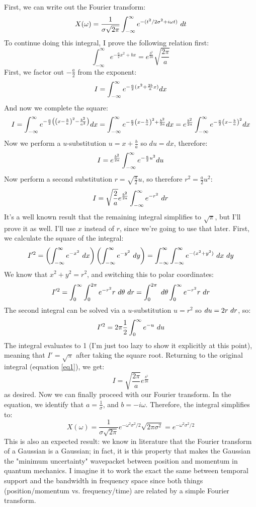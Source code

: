 \documentclass[10pt]{article}
\begin{document}
	\begin{solution}
		First, we can write out the Fourier transform:
		\[
		X(\omega) = \frac{1}{\sigma \sqrt{2\pi} }\int_{-\infty}^{\infty} e^{-(t^2 / 2 \sigma^2 + i \omega t)}
		\ d t
		\] 
		To continue doing this integral, I prove the following relation first:
		\[
		\int_{-\infty}^{\infty} e^{-\frac{a}{2}x^2 + bx} = e^{\frac{b^2}{2a}}\sqrt{\frac{2\pi }{a}} 
		\] 
		First, we factor out \( -\frac{a}{2} \) from the exponent:
				\[
					I = \int_{-\infty}^{\infty} e^{-\frac{a}{2}(x^2 + \frac{2b}{a}x)} dx
				\] 
		And now we complete the square:
		\[
			I = \int_{-\infty}^{\infty} e^{-\frac{a}{2}\left(\left(x - \frac{b}{a}\right)^2 - \frac{b^2}{a^2}\right)} dx
			= \int_{-\infty}^{\infty} e^{-\frac{a}{2}\left( x - \frac{b}{a} \right)^2 + \frac{b^2}{2a}} dx = e^{\frac{b^2}{2a}}
			\int_{-\infty}^{\infty} e^{-\frac{a}{2}\left( x - \frac{b}{a} \right)^2} dx
		\] 
		Now we perform a \( u \)-substitution \( u = x + \frac{b}{a} \) so \( du = dx \), therefore:
		\[
			I = e^{\frac{b^2}{2a}} \int_{-\infty}^{\infty} e^{-\frac{a}{2}u^2} du
		\] 
		Now perform a second substitution \( r = \sqrt{\frac{a}{2}}u \), so therefore \( r^2 = \frac{a}{2}u^2 \):
		\begin{equation}\label{eq1}
		I = \sqrt{\frac{2}{a}}e^{\frac{b^2}{2a}}\int_{-\infty}^{\infty} e^{-r^2} \ d r 
		\end{equation} 
		It's a well known result that the remaining integral simplifies to \( \sqrt{\pi}  \), but I'll prove 
		it as well. I'll use \( x \) instead of \( r \), since we're going to use that later. First, we calculate 
		the square of the integral:
		\[
			I'^2 = \left( \int_{-\infty}^{\infty} e^{-x^2} \ d x  \right) \left( \int_{-\infty}^{\infty} 
			e^{-y^2} \ d y\right) = \int_{-\infty}^{\infty} \int_{-\infty}^{\infty} e^{-(x^2 + y^2)} \ d x \ d y  
		\] 
		We know that \( x^2 + y^2 = r^2 \), and switching this to polar coordinates:
		\[
		I'^2 = \int_{0}^{\infty} \int_{0}^{2\pi} e^{-r^2} r \ d \theta \ d r = \int_{0}^{2\pi} \ d \theta
		\int_{0}^{\infty} e^{-r^2} r \ d r 
		\] 
		The second integral can be solved via a \( u \)-substitution \( u = r^2 \) so \( du = 2r \ d r \), so:
		\[
		I'^2 = 2\pi \frac{1}{2}\int_{0}^{\infty} e^{-u} \ d u 
		\] 
		The integral evaluates to 1 (I'm just too lazy to show it explicitly at this point), meaning that
		\( I' = \sqrt{\pi}  \) after taking the square root. Returning to the original integral (equation 
		\ref{eq1}), we get: 
		\[
		I = \sqrt{\frac{2\pi}{a}} e^{\frac{b^2}{2a}}
		\] 
		as desired. Now we can finally proceed with our Fourier transform. In the equation, we identify that 
		\( a = \frac{1}{\sigma} \), and \( b = -i \omega \). Therefore, the integral simplifies to:
		\[
			X(\omega) = \frac{1}{\sigma \sqrt{2\pi} }e^{-\omega^2 \sigma^2 / 2}\sqrt{2\pi \sigma^2} 
			= e^{-\omega^2 \sigma^2 / 2}
		\] 
		This is also an expected result: we know in literature that the Fourier transform of a Gaussian 
		is a Gaussian; in fact, it is this property that makes the Gaussian the "minimum uncertainty" wavepacket 
		between position and momentum in quantum mechanics. 
		I imagine it to work the exact the same between temporal support
		and the bandwidth in frequency space since both things (position/momentum vs. frequency/time) are related
		by a simple Fourier transform.
	\end{solution}
	\pagebreak
\end{document}
